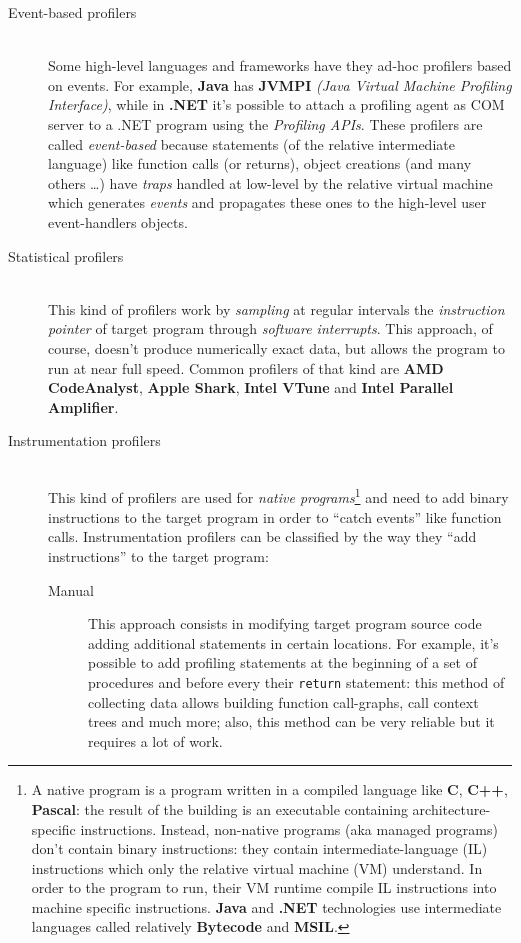 \documentclass[a4paper,11pt]{report}
\begin{document}
\begin{description}
\item[Event-based profilers] \hfill \\
Some high-level languages and frameworks have they ad-hoc profilers based on events. For example, \textbf{Java} has \textbf{JVMPI} \textit{(Java Virtual Machine Profiling Interface)}, while in \textbf{.NET} it's possible to attach a profiling agent as COM server to a .NET program using the \emph{Profiling APIs}. These profilers are called \emph{event-based} because statements (of the relative intermediate language) like function calls (or returns), object creations (and many others \ldots) have \emph{traps} handled at low-level by the relative virtual machine which generates \emph{events} and propagates these ones to the high-level user event-handlers objects.
\item[Statistical profilers] \hfill \\
This kind of profilers work by \emph{sampling} at regular intervals the \emph{instruction pointer} of target program through \emph{software interrupts}. This approach, of course, doesn't produce numerically exact data, but allows the program to run at near full speed. Common profilers of that kind are \textbf{AMD CodeAnalyst}, \textbf{Apple Shark}, \textbf{Intel VTune} and \textbf{Intel Parallel Amplifier}.

\item[Instrumentation profilers] \hfill \\
This kind of profilers are used for \emph{native programs}\footnote{A native program is a program written in a compiled language like \textbf{C}, \textbf{C++}, \textbf{Pascal}: the result of the building is an executable containing architecture-specific instructions. Instead, non-native programs (aka managed programs) don't contain binary instructions: they contain intermediate-language (IL) instructions which only the relative virtual machine (VM) understand. In order to the program to run, their VM runtime compile IL instructions into machine specific instructions. \textbf{Java} and \textbf{.NET} technologies use intermediate languages called relatively \textbf{Bytecode} and \textbf{MSIL}.} and need to add binary instructions to the target program in order to ``catch events'' like function calls. Instrumentation profilers can be classified by the way they ``add instructions'' to the target program:

\begin{description}
\item[Manual]
This approach consists in modifying target program source code adding additional statements in certain locations. For example, it's possible to add profiling statements at the beginning of a set of procedures and before every their \verb|return| statement: this method of collecting data allows building function call-graphs, call context trees and much more; also, this method can be very reliable but it requires a lot of work.


\end{description}
\end{description}
\end{document}
